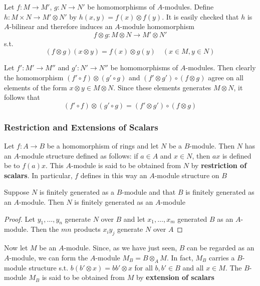 \documentclass[11pt]{article}
\begin{document}
Let \(f:M\to M'\), \(g:N\to N'\) be homomorphisms of \(A\)-modules. Define \(h:M\times N\to M'\otimes N'\)
by \(h(x,y)=f(x)\otimes f(y)\). It is easily checked that \(h\) is \(A\)-bilinear and therefore
induces an \(A\)-module homomorphism
\begin{equation*}
f\otimes g:M\otimes N\to M'\otimes N'
\end{equation*}
s.t.
\begin{equation*}
(f\otimes g)(x\otimes y)=f(x)\otimes g(y)\quad(x\in M,y\in N)
\end{equation*}


Let \(f':M'\to M''\) and \(g':N'\to N''\) be homomorphisms of \(A\)-modules. Then clearly the
homomorphism \((f'\circ f)\otimes(g'\circ g)\) and \((f'\otimes g')\circ(f\otimes g)\) agree on all elements of the
form \(x\otimes y\in M\otimes N\). Since these elements generates \(M\otimes N\), it follows that
\begin{equation*}
(f'\circ f)\otimes(g'\circ g)=(f'\otimes g')\circ(f\otimes g)
\end{equation*}
\subsubsection*{Restriction and Extensions of Scalars}
\label{sec:org0458ebb}
Let \(f:A\to B\) be a homomorphism of rings and let \(N\) be a \(B\)-module. Then \(N\) has
an \(A\)-module structure defined as follows: if \(a\in A\) and \(x\in N\), then \(ax\) is defined
be to \(f(a)x\). This \(A\)-module is said to be obtained from \(N\) by \textbf{restriction of scalars}.
In particular, \(f\) defines in this way an \(A\)-module structure on \(B\)

\begin{proposition}[]
Suppose \(N\) is finitely generated as a \(B\)-module and that \(B\) is finitely generated as
an \(A\)-module. Then \(N\) is finitely generated as an \(A\)-module
\end{proposition}

\begin{proof}
Let \(y_1,\dots,y_n\) generate \(N\) over \(B\) and let \(x_1,\dots,x_m\) generated \(B\) as
an \(A\)-module. Then the \(mn\) products \(x_iy_j\) generate \(N\) over \(A\)
\end{proof}

Now let \(M\) be an \(A\)-module. Since, as we have just seen, \(B\) can be regarded as
an \(A\)-module, we can form the \(A\)-module \(M_B=B\otimes_AM\). In fact, \(M_B\) carries
a \(B\)-module structure s.t. \(b(b'\otimes x)=bb'\otimes x\) for all \(b,b'\in B\) and all \(x\in M\).
The \(B\)-module \(M_B\) is said to be obtained from \(M\) by \textbf{extension of scalars}
\end{document}
